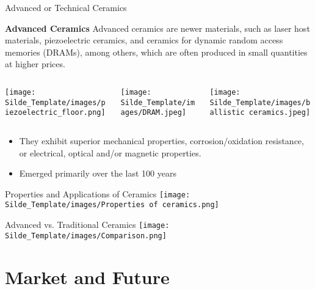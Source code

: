 \documentclass{libs/XJTLU_format}
\begin{document}
\begin{frame}{Advanced or Technical Ceramics}

\textbf{Advanced Ceramics}
Advanced ceramics are newer materials, such as laser host materials, piezoelectric ceramics, and ceramics
for dynamic random access memories (DRAMs), among others, which are often produced in small quantities at higher prices.    
\vspace{1em}

\begin{columns}
  \begin{column}{0.33\textwidth}
    \centering
    \texttt{[image: Silde\_Template/images/piezoelectric\_floor.png]}
  \end{column}
  \begin{column}{0.33\textwidth}
    \centering
    \texttt{[image: Silde\_Template/images/DRAM.jpeg]}
  \end{column}
    \begin{column}{0.33\textwidth}
    \centering
    \texttt{[image: Silde\_Template/images/ballistic ceramics.jpeg]}
  \end{column}
\end{columns}
\pause
\vspace{1em}

\begin{itemize}
    \item They exhibit superior mechanical properties, corrosion/oxidation resistance, or electrical, optical and/or magnetic properties.
    \item Emerged primarily over the last 100 years
\end{itemize}

\end{frame}

\begin{frame}{Properties and Applications of Ceramics}
\centering
\texttt{[image: Silde\_Template/images/Properties of ceramics.png]}
\end{frame}

\begin{frame}{Advanced vs. Traditional Ceramics}
\centering
\texttt{[image: Silde\_Template/images/Comparison.png]}
\end{frame}

\section{Market and Future}
\end{document}
